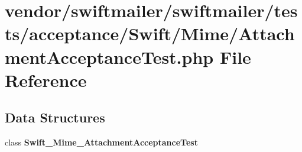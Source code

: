 \section{vendor/swiftmailer/swiftmailer/tests/acceptance/\+Swift/\+Mime/\+Attachment\+Acceptance\+Test.php File Reference}
\label{_mime_2_attachment_acceptance_test_8php}
\subsection*{Data Structures}
\begin{DoxyCompactItemize}
\item 
class {\bf Swift\+\_\+\+Mime\+\_\+\+Attachment\+Acceptance\+Test}
\end{DoxyCompactItemize}
